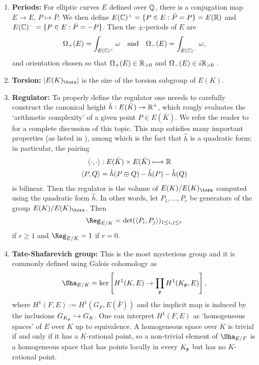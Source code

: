 \begin{enumerate}
    \item \textbf{Periods: } For elliptic curves $E$ defined over $\mathbb{Q}$, there is a conjugation map $E\to E$, $P\mapsto\bar{P}$. We then define $E(\mathbb{C})^+=\{P\in E:\bar{P}=P\}=E(\mathbb{R})$ and $E(\mathbb{C})^-=\{P\in E:\bar{P}=-P\}$. Then the $\pm$-periods of $E$ are 
    $$\Omega_+(E)=\int_{E(\mathbb{C})^+}\omega \quad\text{and}\quad\Omega_-(E)=\int_{E(\mathbb{C})^-}\omega,$$
    and orientation chosen so that $\Omega_+(E)\in\mathbb{R}_{>0}$ and $\Omega_-(E)\in i\mathbb{R}_{>0}$ .
    \item \textbf{Torsion:} $|E(K)_{\tors}|$ is the size of the torsion subgroup of $E(K)$.
    \item \textbf{Regulator:} To properly define the regulator one neeeds to carefully construct the canonical height $\hat{h}:E(\bar{K})\rightarrow\mathbb{R}^+$, which rougly evaluates the `arithmetic complexity' of a given point $P\in E(\bar{K})$. We refer the reader to \cite[Chapter VIII: \S4, \S5, \S6 and \S9]{S1} for a complete discussion of this topic. This map satisfies many important properties (as listed in \cite[Chapter VIII, Theorem 9.3]{S1}), among which is the fact that $\hat{h}$ is a quadratic form; in particular, the pairing
    \begin{align*}
        \langle\cdot,\cdot\rangle&:E(\bar{K})\times E(\bar{K})\longmapsto\mathbb{R}\\
        \langle P,Q\rangle&=\hat{h}(P\oplus Q)-\hat{h}(P)-\hat{h}(Q)
    \end{align*}
    is bilinear. Then the regulator is the volume of $E(K)/E(K)_{\tors}$ computed using the quadratic form $\hat{h}$. In other words, let $P_1,\ldots,P_r$ be generators of the group $E(K)/E(K)_{\tors}$. Then $$\Reg_{E/K}=\det(\langle P_i,P_j\rangle)_{1\leq i,j\leq r}$$
    if $r\geq1$ and $\Reg_{E/K}=1$ if $r=0$.
    \item \textbf{Tate-Shafarevich group:} This is the most mysterious group and it is commonly defined using Galois cohomology as
    $$\Sha_{E/K}=\ker\left[H^1(K,E)\rightarrow\prod_{\pp}H^1(K_\pp,E)\right],$$
    where $H^1(F,E):=H^1(G_F,E(\bar{F}))$ and the implicit map is induced by the inclusions $G_{K_{\mathfrak{p}}}\hookrightarrow G_K$. One can interpret $H^1(F,E)$ as `homogeneous spaces' of $E$ over $K$ up to equivalence. A homogeneous space over $K$ is trivial if and only if it has a $K$-rational point, so a non-trivial element of $\Sha_{E/F}$ is a homogeneous space that has points locally in every $K_{\mathfrak{p}}$ but has no $K$-rational point.


\end{enumerate}
